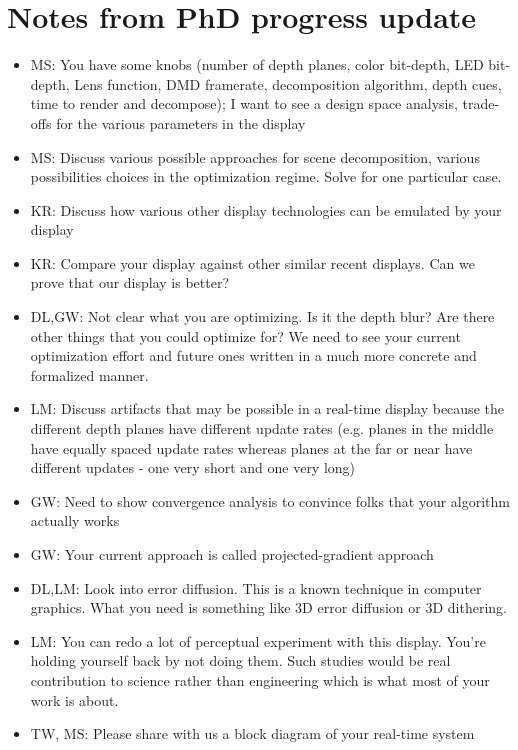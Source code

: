 \section{Notes from PhD progress update}

\begin{itemize}
\item MS: You have some knobs (number of depth planes, color bit-depth, LED bit-depth, Lens function, DMD framerate, decomposition algorithm, depth cues, time to render and decompose); I want to see a design space analysis, trade-offs for the various parameters in the display
\item MS: Discuss various possible approaches for scene decomposition, various possibilities choices in the optimization regime. Solve for one particular case.
\item KR: Discuss how various other display technologies can be emulated by your display
\item KR: Compare your display against other similar recent displays. Can we prove that our display is better?
\item DL,GW: Not clear what you are optimizing. Is it the depth blur? Are there other things that you could optimize for? We need to see your current optimization effort and future ones written in a much more concrete and formalized manner. 
\item LM: Discuss artifacts that may be possible in a real-time display because the different depth planes have different update rates (e.g. planes in the middle have equally spaced update rates whereas planes at the far or near have different updates - one very short and one very long)
\item GW: Need to show convergence analysis to convince folks that your algorithm actually works
\item GW: Your current approach is called projected-gradient approach
\item DL,LM: Look into error diffusion. This is a known technique in computer graphics. What you need is something like 3D error diffusion or 3D dithering.
\item LM: You can redo a lot of perceptual experiment with this display. You're holding yourself back by not doing them. Such studies would be real contribution to science rather than engineering which is what most of your work is about.
\item TW, MS: Please share with us a block diagram of your real-time system
\end{itemize}

